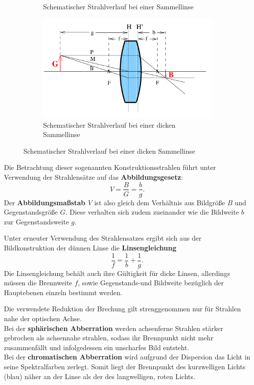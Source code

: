 \begin{figure}
\begin{subfigure}[b]{0.3\textwidth}
        \caption{Schematischer Strahlverlauf bei einer Sammellinse \cite{Anleitung}}
        \label{fig:sammelli}
    \end{subfigure}
    \begin{subfigure}[b]{0.3\textwidth}
        \includegraphics[width=\textwidth]{Bilder/fettelinse.png}
        \caption{Schematischer Strahlverlauf bei einer dicken Sammellinse \cite{Anleitung}}
        \label{fig:diefette}
    \end{subfigure}
\end{figure}
Die Betrachtung dieser sogenannten Konstruktionsstrahlen führt unter Verwendung der Strahlensätze auf das \textbf{Abbildungsgesetz}:
\begin{equation}
  \label{eqn:abbi}
  V=\frac{B}{G}=\frac{b}{g} \text{.}
\end{equation}
Der \textbf{Abbildungsmaßstab $V$} ist also gleich dem Verhältnis aus Bildgröße $B$ und Gegenstandsgröße $G$. Diese verhalten sich zudem zueinander wie die Bildweite $b$ zur Gegenstandsweite $g$.

Unter erneuter Verwendung des Strahlensatzes ergibt sich aus der Bildkonstruktion der dünnen Linse die \textbf{Linsengleichung}
\begin{equation}
  \label{eqn:linsi}
\frac{1}{f}=\frac{1}{b}+\frac{1}{g} \text{.}
\end{equation}
Die Linsengleichung behält auch ihre Gültigkeit für dicke Linsen, allerdings müssen die Brennweite $f$, sowie Gegenstands-und Bildweite bezüglich der Hauptebenen einzeln bestimmt werden.

Die verwendete Reduktion der Brechung gilt strenggenommen nur für Strahlen nahe der optischen Achse.
\\Bei der \textbf{sphärischen Abberration} werden achsenferne Strahlen stärker gebrochen als achsennahe strahlen, sodass ihr Brennpunkt nicht mehr zusammenfällt und infolgedessen ein unscharfes Bild entsteht.
\\Bei der \textbf{chromatischen Abberration} wird aufgrund der Dispersion das Licht in seine Spektralfarben zerlegt. Somit liegt der Brennpunkt des kurzwelligen Lichts (blau) näher an der Linse als der des langwelligen, roten Lichts.

